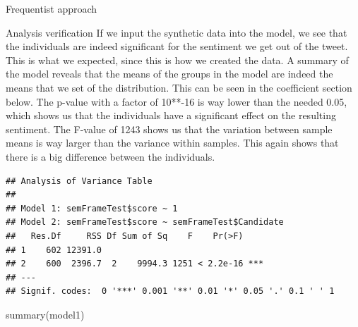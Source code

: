 \documentclass[
  ignorenonframetext,
]{beamer}
\newenvironment{Shaded}{\begin{snugshade}}{\end{snugshade}}
\newcommand{\AttributeTok}[1]{\textcolor[rgb]{0.77,0.63,0.00}{#1}}
\newcommand{\CommentTok}[1]{\textcolor[rgb]{0.56,0.35,0.01}{\textit{#1}}}
\newcommand{\DecValTok}[1]{\textcolor[rgb]{0.00,0.00,0.81}{#1}}
\newcommand{\FunctionTok}[1]{\textcolor[rgb]{0.00,0.00,0.00}{#1}}
\newcommand{\NormalTok}[1]{#1}
\newcommand{\OtherTok}[1]{\textcolor[rgb]{0.56,0.35,0.01}{#1}}
\newcommand{\SpecialCharTok}[1]{\textcolor[rgb]{0.00,0.00,0.00}{#1}}
\begin{document}
\begin{frame}[fragile]{Frequentist approach}
\protect\hypertarget{frequentist-approach}{}
\begin{block}{Analysis verification}
\protect\hypertarget{analysis-verification}{}
If we input the synthetic data into the model, we see that the
individuals are indeed significant for the sentiment we get out of the
tweet. This is what we expected, since this is how we created the data.
A summary of the model reveals that the means of the groups in the model
are indeed the means that we set of the distribution. This can be seen
in the coefficient section below. The p-value with a factor of 10**-16
is way lower than the needed 0.05, which shows us that the individuals
have a significant effect on the resulting sentiment. The F-value of
1243 shows us that the variation between sample means is way larger than
the variance within samples. This again shows that there is a big
difference between the individuals.

\begin{Shaded}
\end{Shaded}

\begin{verbatim}
## Analysis of Variance Table
## 
## Model 1: semFrameTest$score ~ 1
## Model 2: semFrameTest$score ~ semFrameTest$Candidate
##   Res.Df     RSS Df Sum of Sq    F    Pr(>F)    
## 1    602 12391.0                                
## 2    600  2396.7  2    9994.3 1251 < 2.2e-16 ***
## ---
## Signif. codes:  0 '***' 0.001 '**' 0.01 '*' 0.05 '.' 0.1 ' ' 1
\end{verbatim}

\begin{Shaded}
\begin{Highlighting}[]
\FunctionTok{summary}\NormalTok{(model1)}
\end{Highlighting}
\end{Shaded}


\end{block}
\end{frame}
\end{document}
